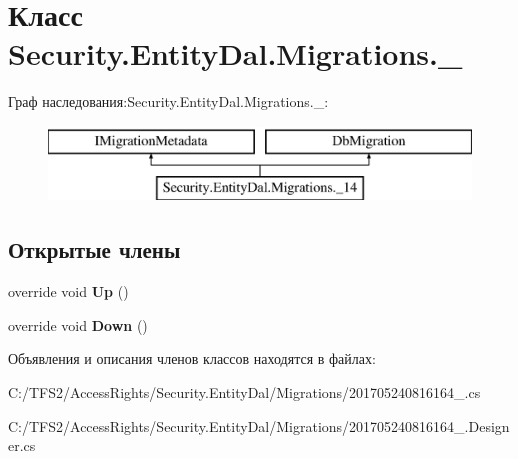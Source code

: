 \hypertarget{class_security_1_1_entity_dal_1_1_migrations_1_1__14}{}\section{Класс Security.\+Entity\+Dal.\+Migrations.\+\_}
\label{class_security_1_1_entity_dal_1_1_migrations_1_1__14}
Граф наследования\+:Security.\+Entity\+Dal.\+Migrations.\+\_\+:\begin{figure}[H]
\begin{center}
\leavevmode
\includegraphics[height=2.000000cm]{df/d14/class_security_1_1_entity_dal_1_1_migrations_1_1__14}
\end{center}
\end{figure}
\subsection*{Открытые члены}
\begin{DoxyCompactItemize}
\item 
\mbox{\label{class_security_1_1_entity_dal_1_1_migrations_1_1__14_ae92708d639400185307c9493b36d913e}} 
override void {\bfseries Up} ()
\item 
\mbox{\label{class_security_1_1_entity_dal_1_1_migrations_1_1__14_a44c63dfa64efeb48c75a6660cc9a7f1a}} 
override void {\bfseries Down} ()
\end{DoxyCompactItemize}


Объявления и описания членов классов находятся в файлах\+:\begin{DoxyCompactItemize}
\item 
C\+:/\+T\+F\+S2/\+Access\+Rights/\+Security.\+Entity\+Dal/\+Migrations/201705240816164\+\_.\+cs\item 
C\+:/\+T\+F\+S2/\+Access\+Rights/\+Security.\+Entity\+Dal/\+Migrations/201705240816164\+\_.\+Designer.\+cs\end{DoxyCompactItemize}
